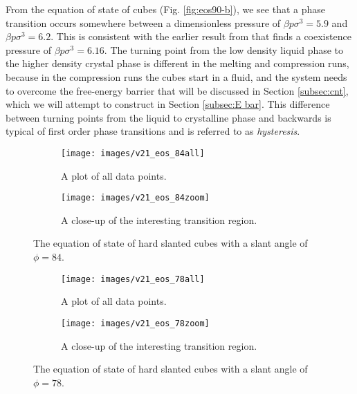 \documentclass[thesis]{subfiles}
\begin{document}
\bigskip
From the equation of state of cubes (Fig. \ref{fig:eos90-b}), we see that a phase transition occurs somewhere between a dimensionless pressure of $\beta p \sigma^3 = 5.9$ and $\beta p \sigma^3 = 6.2$. This is consistent with the earlier result from \cite{smallenburg2012vacancy} that finds a coexistence pressure of $\beta p \sigma^3 = 6.16$. The turning point from the low density liquid phase to the higher density crystal phase is different in the melting and compression runs, because in the compression runs the cubes start in a fluid, and the system needs to overcome the free-energy barrier that will be discussed in Section \ref{subsec:cnt}, which we will attempt to construct in Section \ref{subsec:E bar}. This difference between turning points from the liquid to crystalline phase and backwards is typical of first order phase transitions and is referred to as \emph{hysteresis}.\\

\begin{figure}[h]
	\begin{subfigure}[t]{0.475\textwidth}
		\texttt{[image: images/v21\_eos\_84all]}
		\caption{A plot of all data points.}
		\label{fig:eos84-a}
	\end{subfigure}\hfill
	\begin{subfigure}[t]{0.475\textwidth}
		\texttt{[image: images/v21\_eos\_84zoom]}
		\caption{A close-up of the interesting transition region.}
		\label{fig:eos84-b}
	\end{subfigure}
	\caption{The equation of state of hard slanted cubes with a slant angle of $\phi = 84$\degr.}
	\label{fig:eos84}
\end{figure}

\begin{figure}[h]
	\begin{subfigure}[t]{0.475\textwidth}
		\texttt{[image: images/v21\_eos\_78all]}
		\caption{A plot of all data points.}
		\label{fig:eos78-a}
	\end{subfigure}\hfill
	\begin{subfigure}[t]{0.475\textwidth}
		\texttt{[image: images/v21\_eos\_78zoom]}
		\caption{A close-up of the interesting transition region.}
		\label{fig:eos78-b}
	\end{subfigure}
	\caption{The equation of state of hard slanted cubes with a slant angle of $\phi = 78$\degr.}
	\label{fig:eos78}
\end{figure}
\end{document}
